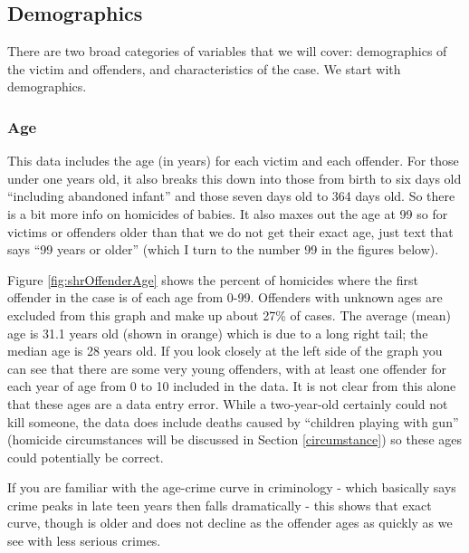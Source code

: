 \documentclass[
]{krantz}
\begin{document}
\subsection{Demographics}\label{demographics}

There are two broad categories of variables that we will
cover: demographics of the victim and offenders, and
characteristics of the case. We start with demographics.

\subsubsection{Age}\label{age-1}

This data includes the age (in years) for each victim and
each offender. For those under one years old, it also breaks
this down into those from birth to six days old ``including
abandoned infant'' and those seven days old to 364 days old.
So there is a bit more info on homicides of babies. It also
maxes out the age at 99 so for victims or offenders older
than that we do not get their exact age, just text that says
``99 years or older'' (which I turn to the number 99 in the
figures below).

Figure \ref{fig:shrOffenderAge} shows the percent of
homicides where the first offender in the case is of each
age from 0-99. Offenders with unknown ages are excluded from
this graph and make up about 27\% of cases. The average
(mean) age is 31.1 years old (shown in orange) which is due
to a long right tail; the median age is 28 years old. If you
look closely at the left side of the graph you can see that
there are some very young offenders, with at least one
offender for each year of age from 0 to 10 included in the
data. It is not clear from this alone that these ages are a
data entry error. While a two-year-old certainly could not
kill someone, the data does include deaths caused by
``children playing with gun'' (homicide circumstances will
be discussed in Section \ref{circumstance}) so these ages
could potentially be correct.

If you are familiar with the age-crime curve in criminology
- which basically says crime peaks in late teen years then
falls dramatically - this shows that exact curve, though is
older and does not decline as the offender ages as quickly
as we see with less serious crimes.
\end{document}
